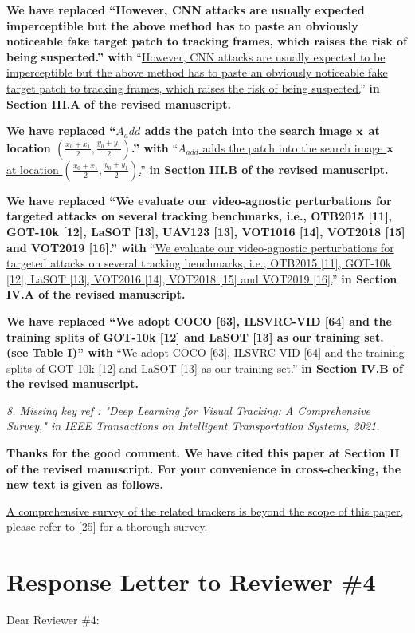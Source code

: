 \documentclass[12pt]{article}
\begin{document}
\textbf{We have replaced ``However, CNN attacks are usually expected imperceptible but the above method has to paste an obviously noticeable fake target patch to tracking frames, which raises the risk of being suspected.'' with}
``\uline{However, CNN attacks are usually expected to be imperceptible but the above method has to paste an obviously noticeable fake target patch to tracking frames, which raises the risk of being suspected.}''
\textbf{in Section III.A of the revised manuscript.}

\textbf{We have  replaced ``$A_add$ adds the patch into the search image $\textbf x$ at location $(\frac{x_0+x_1}{2},\frac{y_0+y_1}{2})$.'' with}
``\uline{$A_{add}$ adds the patch into the search image $\textbf x$ at location $(\frac{x_0+x_1}{2},\frac{y_0+y_1}{2})$.}''
\textbf{in Section III.B of the revised manuscript.}

\textbf{We have replaced ``We evaluate our video-agnostic perturbations for targeted attacks on several tracking benchmarks, i.e., OTB2015 [11], GOT-10k [12], LaSOT [13], UAV123 [13], VOT1016 [14], VOT2018 [15] and VOT2019 [16].'' with}
``\uline{We evaluate our video-agnostic perturbations for targeted attacks on several tracking benchmarks, i.e., OTB2015 [11], GOT-10k [12], LaSOT [13], VOT2016 [14], VOT2018 [15] and VOT2019 [16].}''
\textbf{in Section IV.A of the revised manuscript.}

\textbf{We have replaced ``We adopt COCO [63], ILSVRC-VID [64] and the training splits of GOT-10k [12] and LaSOT [13] as our training set. (see Table I)'' with}
``\uline{We adopt COCO [63], ILSVRC-VID [64] and the training splits of GOT-10k [12] and LaSOT [13] as our training set.}''
\textbf{in Section IV.B of the revised manuscript.}

\textit{8. Missing key ref : "Deep Learning for Visual Tracking: A Comprehensive Survey," in IEEE Transactions on Intelligent Transportation Systems, 2021.}

\textbf{Thanks for the good comment. We have cited this paper at Section II of the revised manuscript.  For your convenience in cross-checking, the new text is given as follows.}

\uline{A comprehensive survey of the related trackers is beyond the scope of this paper, please refer to [25] for a thorough survey.}

\clearpage
\newpage
{\centering\section*{Response Letter to Reviewer \#4}}
\noindent Dear Reviewer \#4:
\end{document}
